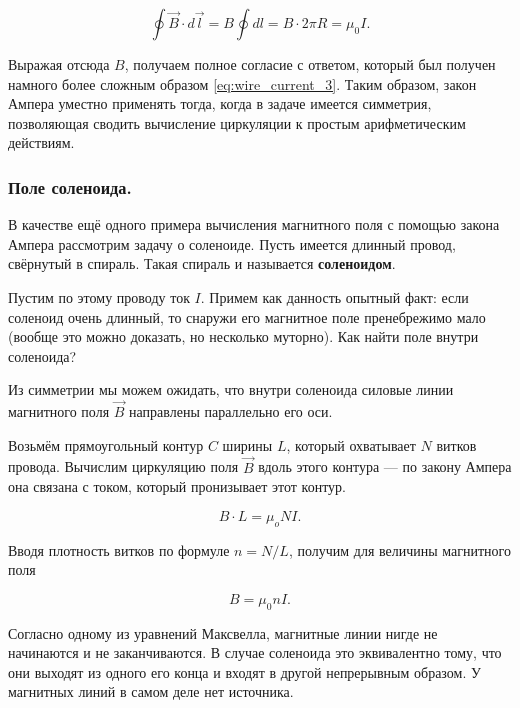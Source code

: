 \documentclass[a4paper,12pt]{article}
\numberwithin{equation}{section}
\begin{document}
\begin{equation}
  \label{eq:wire_current_ampere}
  \oint \vec{B} \cdot d\vec{l} = B \oint dl = B\cdot 2\pi R = \mu_0 I.
\end{equation}

Выражая отсюда $B$, получаем полное согласие с ответом, который был
получен намного более сложным образом \eqref{eq:wire_current_3}. Таким
образом, закон Ампера уместно применять тогда, когда в задаче имеется
симметрия, позволяющая сводить вычисление циркуляции к простым
арифметическим действиям. 

\subsubsection{Поле соленоида. }
\label{sec:solenoid}

В качестве ещё одного примера вычисления магнитного поля с помощью
закона Ампера рассмотрим задачу о соленоиде. Пусть имеется длинный
провод, свёрнутый в спираль. Такая спираль и называется
\textbf{соленоидом}. 

Пустим по этому проводу ток $I$. Примем как данность опытный факт:
если соленоид очень длинный, то снаружи его магнитное поле
пренебрежимо мало (вообще это можно доказать, но несколько
муторно). Как найти поле внутри соленоида? 

Из симметрии мы можем ожидать, что внутри соленоида силовые линии
магнитного поля $\vec{B}$ направлены параллельно его оси. 

Возьмём прямоугольный контур $C$ ширины $L$, который охватывает $N$
витков провода. Вычислим циркуляцию поля $\vec{B}$ вдоль этого
контура --- по закону Ампера она связана с током, который пронизывает
этот контур. 

\begin{equation}
  \label{eq:der_mfield_solenoid}
  B \cdot L = \mu_o N I.
\end{equation}

Вводя плотность витков по формуле $n = N/L$, получим для величины
магнитного поля

\begin{equation}
  \label{eq:mfield_solenoid}
  B = \mu_0 n I.
\end{equation}

Согласно одному из уравнений Максвелла, магнитные линии нигде не
начинаются и не заканчиваются. В случае соленоида это эквивалентно
тому, что они выходят из одного его конца и входят в другой
непрерывным образом. У магнитных линий в самом деле нет источника. 
\end{document}
